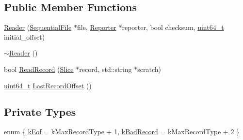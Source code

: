 \subsection*{Public Member Functions}
\begin{DoxyCompactItemize}
\item 
\hyperlink{classleveldb_1_1log_1_1_reader_a38c1a9988741af5429dad60cf79f0556}{Reader} (\hyperlink{classleveldb_1_1_sequential_file}{Sequential\+File} $\ast$file, \hyperlink{classleveldb_1_1log_1_1_reader_1_1_reporter}{Reporter} $\ast$reporter, bool checksum, \hyperlink{stdint_8h_aaa5d1cd013383c889537491c3cfd9aad}{uint64\+\_\+t} initial\+\_\+offset)
\item 
\hyperlink{classleveldb_1_1log_1_1_reader_a52bc3896f8a0baee92f8c699553e7841}{$\sim$\+Reader} ()
\item 
bool \hyperlink{classleveldb_1_1log_1_1_reader_a84059598c9367cb677a9d70d77993282}{Read\+Record} (\hyperlink{classleveldb_1_1_slice}{Slice} $\ast$record, std\+::string $\ast$scratch)
\item 
\hyperlink{stdint_8h_aaa5d1cd013383c889537491c3cfd9aad}{uint64\+\_\+t} \hyperlink{classleveldb_1_1log_1_1_reader_a358c5545069d86a61948ac0a021aa7f6}{Last\+Record\+Offset} ()
\end{DoxyCompactItemize}
\subsection*{Private Types}
\begin{DoxyCompactItemize}
\item 
enum \{ \hyperlink{classleveldb_1_1log_1_1_reader_ad7bef0b8e83895e4145cd9c726482c31a092b38252c5b000ba43b38729810ef14}{k\+Eof} = k\+Max\+Record\+Type + 1, 
\hyperlink{classleveldb_1_1log_1_1_reader_ad7bef0b8e83895e4145cd9c726482c31a82ce7f7fb8f153b170a640fe29384cfd}{k\+Bad\+Record} = k\+Max\+Record\+Type + 2
 \}
\end{DoxyCompactItemize}

